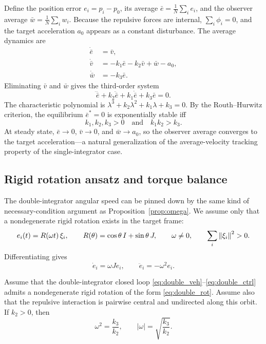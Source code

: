 Define the position error $e_i=p_i-p_0$, its average $\bar{e}=\frac1N\sum_i e_i$, and the observer
average $\bar{w}=\frac1N\sum_i w_i$. Because the repulsive forces are internal, $\sum_i\phi_i=0$,
and the target acceleration $a_0$ appears as a constant disturbance. The average dynamics are
\begin{align}
  \dot{\bar{e}} &= \bar{v}, \\
  \dot{\bar{v}} &= -k_1\bar{e} - k_2\bar{v} + \bar{w} - a_0, \\
  \dot{\bar{w}} &= -k_3\bar{e}.
  \label{eq:double_avg}
\end{align}
Eliminating $\bar{v}$ and $\bar{w}$ gives the third-order system
\begin{equation}
  \dddot{\bar{e}} + k_2\ddot{\bar{e}} + k_1\dot{\bar{e}} + k_3\bar{e} = 0 .
  \label{eq:double_avg3}
\end{equation}
The characteristic polynomial is $\lambda^3+k_2\lambda^2+k_1\lambda+k_3=0$. By the
Routh--Hurwitz criterion, the equilibrium $\bar{e}^*=0$ is exponentially stable iff
\begin{equation}
  k_1,k_2,k_3>0\quad\text{and}\quad k_1k_2>k_3.
  \label{eq:double_stab}
\end{equation}
At steady state, $\bar{e}\to0$, $\bar{v}\to0$, and $\bar{w}\to a_0$, so the observer average
converges to the target acceleration---a natural generalization of the average-velocity tracking
property of the single-integrator case.

\subsection{Rigid rotation ansatz and torque balance}
\label{sec:double_torque}

The double-integrator angular speed can be pinned down by the same kind of necessary-condition
argument as Proposition~\ref{prop:omega}. We assume only that a nondegenerate rigid rotation exists
in the target frame:
\begin{equation}
  e_i(t)=R(\omega t)\,\xi_i,
  \qquad R(\theta)=\cos\theta\,I+\sin\theta\,J,
  \qquad \omega\ne0,
  \qquad \sum_i\left\| \xi_i \right\|^2>0 .
  \label{eq:double_rot}
\end{equation}
Differentiating gives
\begin{equation}
  \dot{e}_i=\omega J e_i,
  \qquad \ddot{e}_i=-\omega^2 e_i.
  \label{eq:double_deriv}
\end{equation}

\begin{proposition}\label{prop:double_omega}
Assume that the double-integrator closed loop \eqref{eq:double_veh}--\eqref{eq:double_ctrl} admits a
nondegenerate rigid rotation of the form \eqref{eq:double_rot}. Assume also that the repulsive
interaction is pairwise central and undirected along this orbit. If $k_2>0$, then
\begin{equation}
  \omega^2=\frac{k_3}{k_2},
  \qquad |\omega|=\sqrt{\frac{k_3}{k_2}}.
\end{equation}
\end{proposition}

